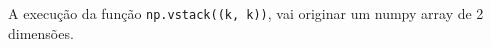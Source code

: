 \documentclass[12pt,varwidth=16cm,border=1pt]{standalone}
\begin{document}
A execução da função \verb+np.vstack((k, k))+, vai originar um numpy array de 2 dimensões.

\questiomtrue
\end{document}
